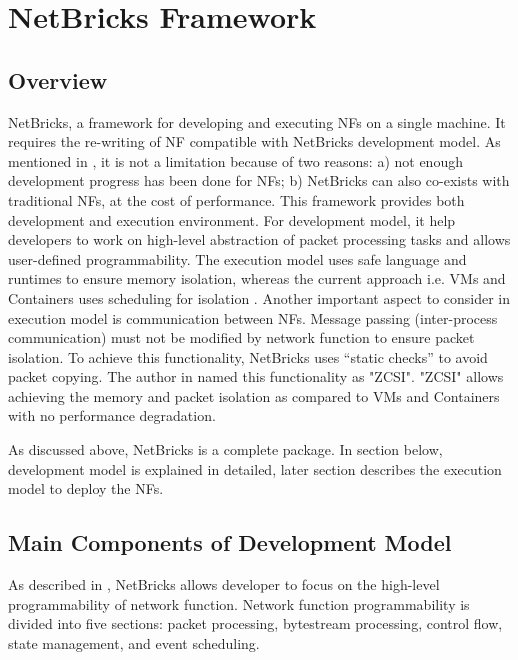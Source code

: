 \documentclass[10pt, a4paper, conference]{IEEEtran}
\begin{document}
\section{NetBricks Framework}
\label{NetBricks}
\subsection*{Overview}
NetBricks, a framework for developing and executing NFs on a single machine. It requires the re-writing of NF compatible with NetBricks development model. As mentioned in \cite{Panda2016}, it is not a limitation because of two reasons: a) not enough development progress has been done for NFs; b) NetBricks can also co-exists with traditional NFs, at the cost of performance.
This framework provides both development and execution environment. For development model, it help developers to work on high-level abstraction of packet processing tasks and allows user-defined programmability. The execution model uses safe language and runtimes to ensure memory isolation, whereas the current approach i.e. VMs and Containers uses scheduling for isolation \cite{Panda2016}. Another important aspect to consider in execution model is communication between NFs. Message passing (inter-process communication) must not be modified by network function to ensure packet isolation. To achieve this functionality, NetBricks uses “static checks” to avoid packet copying. The author in \cite{Panda2016} named this functionality as "ZCSI". "ZCSI" allows achieving the memory and packet isolation as compared to VMs and Containers with no performance degradation. 

As discussed above, NetBricks is a complete package. In section below, development model is explained in detailed, later section describes the execution model to deploy the NFs.
\subsection{Main Components of Development Model}
 As described in \cite{Panda2016}, NetBricks allows developer to focus on the high-level programmability of network function. Network function programmability is divided into five sections: packet processing, bytestream processing, control flow, state management, and event scheduling.
\end{document}
